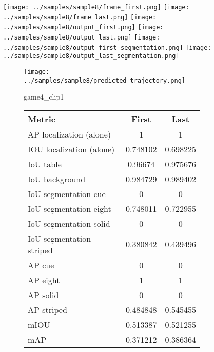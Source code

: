 \begin{figure}
    \texttt{[image: ../samples/sample8/frame\_first.png]}
    \texttt{[image: ../samples/sample8/frame\_last.png]}
    \newline
    \texttt{[image: ../samples/sample8/output\_first.png]}
    \texttt{[image: ../samples/sample8/output\_last.png]}
    \newline
    \texttt{[image: ../samples/sample8/output\_first\_segmentation.png]}
    \texttt{[image: ../samples/sample8/output\_last\_segmentation.png]}
    \newline
    \begin{subfigure}[b]{0.49\textwidth}
        \vspace{20pt}
        \texttt{[image: ../samples/sample8/predicted\_trajectory.png]}
        \caption*{game4\_clip1}
    \end{subfigure}
\begin{subfigure}[b]{0.49\textwidth}
    \begin{tabular}{|l|c|c|}
        \hline
        \textbf{Metric} & \textbf{First} & \textbf{Last} \\
        \hline
        AP localization (alone) & 1 & 1 \\ 
        IOU localization (alone) & 0.748102 & 0.698225 \\ 
        \hline
        IoU table & 0.96674 & 0.975676 \\ 
        IoU background & 0.984729 & 0.989402 \\ 
        \hline
        IoU segmentation cue & 0 & 0 \\ 
        IoU segmentation eight & 0.748011 & 0.722955 \\ 
        IoU segmentation solid & 0 & 0 \\ 
        IoU segmentation striped & 0.380842 & 0.439496 \\ 
        \hline
        AP cue & 0 & 0 \\ 
        AP eight & 1 & 1 \\ 
        AP solid & 0 & 0 \\ 
        AP striped & 0.484848 & 0.545455 \\ 
        \hline
        mIOU & 0.513387 & 0.521255 \\ 
        mAP & 0.371212 & 0.386364 \\ 
        \hline
    \end{tabular}    
\end{subfigure}
\end{figure}

